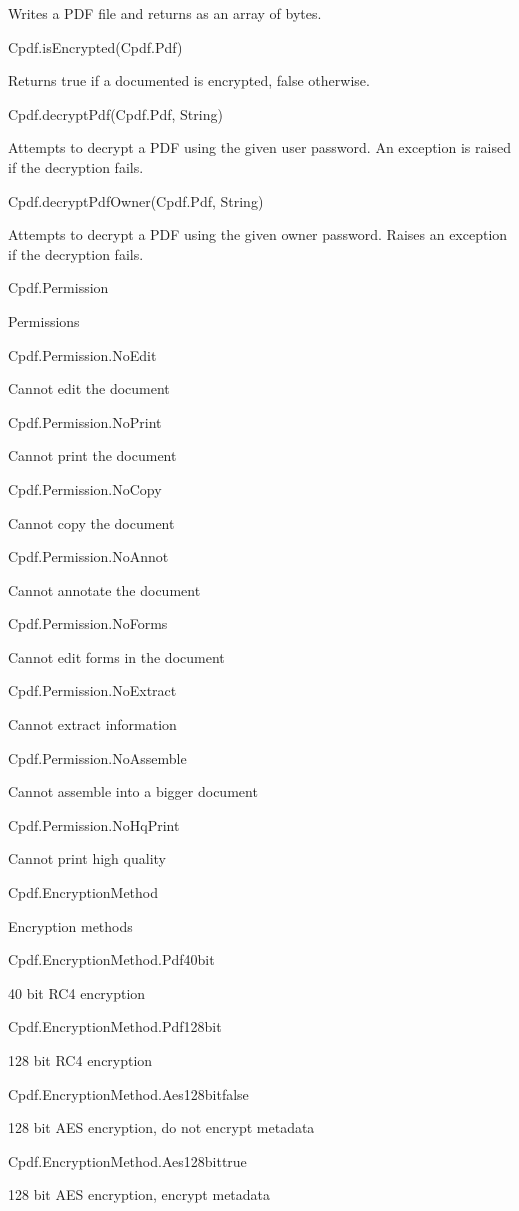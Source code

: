 Writes a PDF file 
and returns as an array of bytes.

Cpdf.isEncrypted(Cpdf.Pdf)

Returns true if a documented is encrypted, false
otherwise.

Cpdf.decryptPdf(Cpdf.Pdf, String)

Attempts to decrypt a PDF using the given
user password. An exception is raised if the decryption fails.

Cpdf.decryptPdfOwner(Cpdf.Pdf, String)

Attempts to decrypt a PDF using the
given owner password. Raises an exception if the decryption fails.

Cpdf.Permission

Permissions

Cpdf.Permission.NoEdit

Cannot edit the document

Cpdf.Permission.NoPrint

Cannot print the document

Cpdf.Permission.NoCopy

Cannot copy the document

Cpdf.Permission.NoAnnot

Cannot annotate the document

Cpdf.Permission.NoForms

Cannot edit forms in the document

Cpdf.Permission.NoExtract

Cannot extract information

Cpdf.Permission.NoAssemble

Cannot assemble into a bigger document

Cpdf.Permission.NoHqPrint

Cannot print high quality

Cpdf.EncryptionMethod

Encryption methods

Cpdf.EncryptionMethod.Pdf40bit

40 bit RC4 encryption

Cpdf.EncryptionMethod.Pdf128bit

128 bit RC4 encryption

Cpdf.EncryptionMethod.Aes128bitfalse

128 bit AES encryption, do not encrypt metadata

Cpdf.EncryptionMethod.Aes128bittrue

128 bit AES encryption, encrypt metadata

